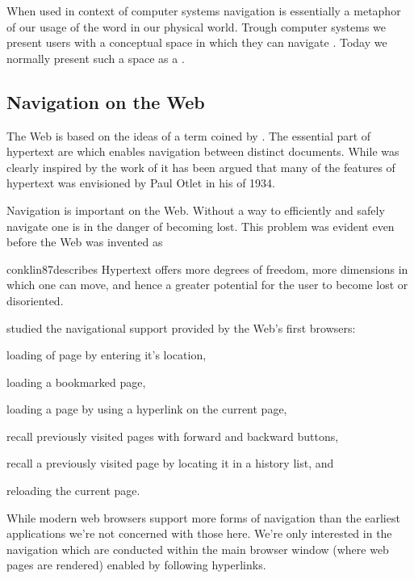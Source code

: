 When used in context of
computer systems navigation is essentially a metaphor of our usage of the
word in our physical world. Trough computer systems we present users with a
conceptual space in which they can navigate \citep[]{whiteside85}.
Today we normally present such a space as a %
.

\subsection{Navigation on the Web}
\label{section:background.navigation.navigation.on.the.web}

The Web is based on the ideas of \dash{}a term coined by
\citet[]{nelson65}. The essential part of hypertext are
 \citep[]{nelson65} which enables navigation between
distinct documents. While \citeauthor{nelson65} was clearly
inspired by the work of \citet{bush45} it has been argued \citep{rayward94}
that many of the features of hypertext was envisioned by Paul Otlet in his
 of 1934.

Navigation is important on the Web. Without a way to efficiently and safely
navigate one is in the danger of becoming lost. This problem was evident even
before the Web was invented as
\begin{fullquote}[\p{38}]{conklin87}{describes}
  Hypertext offers more degrees of freedom, more dimensions in which one
  can move, and hence a greater potential for the user
  to become lost or disoriented.
\end{fullquote}

\citet{jones96} studied the navigational support provided by the Web's first
browsers:
\begin{inparaenum}[(i)]
  \item loading of page by entering it's location,
  \item loading a bookmarked page,
  \item loading a page by using a hyperlink on the current page,
  \item recall previously visited pages with forward and backward buttons,
  \item recall a previously visited page by locating it in a history list, and
  \item reloading the current page.
\end{inparaenum}
While modern web browsers support more forms of navigation%
than the earliest applications we're not concerned with those here.
We're only interested in the navigation which are conducted within the main
browser window (where web pages are rendered) enabled by following hyperlinks.

